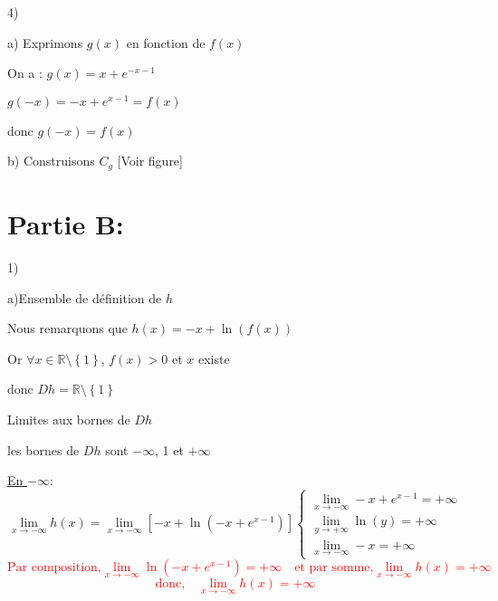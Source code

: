 \documentclass[12pt]{article}
\begin{document}
4)

a) Exprimons $g(x)$ en fonction de $f(x)$

On a : $g(x)=x+e^{-x-1}$

$g(-x)=-x+e^{x-1}=f(x)$

donc $g(-x)=f(x)$

 b) Construisons $C_{g}$ [Voir figure]
 
 \section*{Partie B:}
 1)

	a)Ensemble de définition de $h$

Nous remarquons que 	$h(x)=-x+\ln(f(x))$

Or $\forall x\in \mathbb{R}\setminus\left\lbrace 1\right\rbrace $, $f(x)>0$ et $x$ existe

donc $Dh=\mathbb{R}\setminus\left\lbrace 1\right\rbrace $

Limites aux bornes de $Dh$

les bornes de $Dh$ sont $-\infty$, 1 et $+\infty$

\underline{En $-\infty$}:
\begin{equation*}
\lim_{x \to -\infty}h(x)=\lim_{x \to -\infty}\left[ -x+\ln(-x+e^{x-1})\right] 
\begin{cases}
\lim_{x \to -\infty} -x+e^{x-1}=+\infty\\
\lim_{y \to +\infty}\ln(y)=+\infty\\
\lim_{x \to -\infty}-x=+\infty
\end{cases}
\end{equation*}
\textcolor{red}{\[\text{Par composition,}\lim_{x \to -\infty}\ln(-x+e^{x-1})=+\infty\quad\text{et par somme,}\lim_{x \to -\infty}h(x)=+\infty\]} 
\textcolor{red}{\[\text{donc,}\quad \lim_{x \to -\infty}h(x)=+\infty\]}
\end{document}
